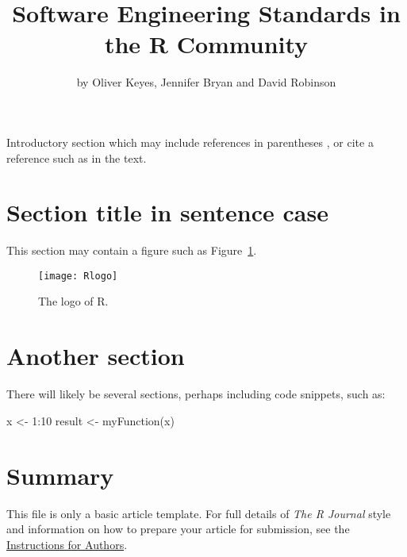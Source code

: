 \title{Software Engineering Standards in the R Community}
\author{by Oliver Keyes, Jennifer Bryan and David Robinson}

\maketitle


Introductory section which may include references in parentheses
\citep{R}, or cite a reference such as \citet{R} in the text.

\section{Section title in sentence case}

This section may contain a figure such as Figure~\ref{figure:rlogo}.

\begin{figure}[htbp]
  \centering
  \texttt{[image: Rlogo]}
  \caption{The logo of R.}
  \label{figure:rlogo}
\end{figure}

\section{Another section}

There will likely be several sections, perhaps including code snippets, such as:

\begin{example}
  x <- 1:10
  result <- myFunction(x)
\end{example}

\section{Summary}

This file is only a basic article template. For full details of \emph{The R Journal} style and information on how to prepare your article for submission, see the \href{http://journal.r-project.org/latex/RJauthorguide.pdf}{Instructions for Authors}.



\address{Author One\\
  Affiliation\\
  Address\\
  Country\\}

\address{Author Two\\
  Affiliation\\
  Address\\
  Country\\}

\address{Author Three\\
  Affiliation\\
  Address\\
  Country\\}

